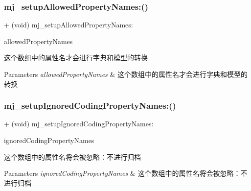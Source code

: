 \subsubsection{\texorpdfstring{mj\+\_\+setup\+Allowed\+Property\+Names\+:()}{mj\_setupAllowedPropertyNames:()}\hspace{0.1cm}{\footnotesize\ttfamily [3/3]}}
{\footnotesize\ttfamily + (void) mj\+\_\+setup\+Allowed\+Property\+Names\+: \begin{DoxyParamCaption}\item[{(M\+J\+Allowed\+Property\+Names)}]{allowed\+Property\+Names }\end{DoxyParamCaption}}

这个数组中的属性名才会进行字典和模型的转换


\begin{DoxyParams}{Parameters}
{\em allowed\+Property\+Names} & 这个数组中的属性名才会进行字典和模型的转换 \\
\hline
\end{DoxyParams}
\mbox{\label{category_n_s_object_07_m_j_class_08_ad89c658e8ab42bcba921a1c6e921c1cd}} 
\subsubsection{\texorpdfstring{mj\+\_\+setup\+Ignored\+Coding\+Property\+Names\+:()}{mj\_setupIgnoredCodingPropertyNames:()}\hspace{0.1cm}{\footnotesize\ttfamily [1/3]}}
{\footnotesize\ttfamily + (void) mj\+\_\+setup\+Ignored\+Coding\+Property\+Names\+: \begin{DoxyParamCaption}\item[{(M\+J\+Ignored\+Coding\+Property\+Names)}]{ignored\+Coding\+Property\+Names }\end{DoxyParamCaption}}

这个数组中的属性名将会被忽略：不进行归档


\begin{DoxyParams}{Parameters}
{\em ignored\+Coding\+Property\+Names} & 这个数组中的属性名将会被忽略：不进行归档 \\
\hline
\end{DoxyParams}
\mbox{\label{category_n_s_object_07_m_j_class_08_ad89c658e8ab42bcba921a1c6e921c1cd}} 
